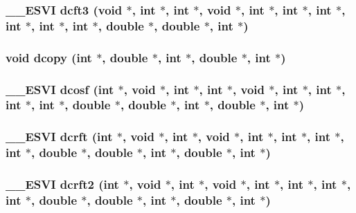 \subsubsection{\setlength{\rightskip}{0pt plus 5cm}\_\-\_\-ESVI dcft3 (void $\ast$, int $\ast$, int $\ast$, void $\ast$, int $\ast$, int $\ast$, int $\ast$, int $\ast$, int $\ast$, int $\ast$, double $\ast$, double $\ast$, int $\ast$)}\label{essl_8h_2448f2b7fb21350b16026156637d3777}


\subsubsection{\setlength{\rightskip}{0pt plus 5cm}void dcopy (int $\ast$, double $\ast$, int $\ast$, double $\ast$, int $\ast$)}\label{essl_8h_67fe56e99de691a932433aac47f2bcae}


\subsubsection{\setlength{\rightskip}{0pt plus 5cm}\_\-\_\-ESVI dcosf (int $\ast$, void $\ast$, int $\ast$, int $\ast$, void $\ast$, int $\ast$, int $\ast$, int $\ast$, int $\ast$, double $\ast$, double $\ast$, int $\ast$, double $\ast$, int $\ast$)}\label{essl_8h_d268ebcc7b0a9749bf6a60496b331ddd}


\subsubsection{\setlength{\rightskip}{0pt plus 5cm}\_\-\_\-ESVI dcrft (int $\ast$, void $\ast$, int $\ast$, void $\ast$, int $\ast$, int $\ast$, int $\ast$, int $\ast$, double $\ast$, double $\ast$, int $\ast$, double $\ast$, int $\ast$)}\label{essl_8h_a0276c5511d55d5d33950ae505e39271}


\subsubsection{\setlength{\rightskip}{0pt plus 5cm}\_\-\_\-ESVI dcrft2 (int $\ast$, void $\ast$, int $\ast$, void $\ast$, int $\ast$, int $\ast$, int $\ast$, int $\ast$, double $\ast$, double $\ast$, int $\ast$, double $\ast$, int $\ast$)}\label{essl_8h_68d95c1c6eb5500fa23e6973238fea71}


